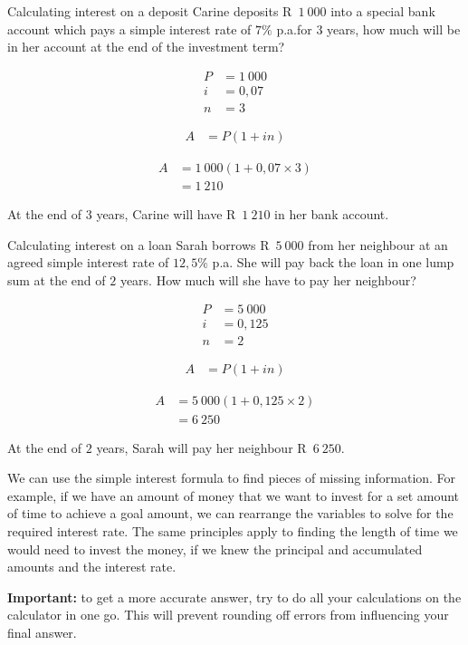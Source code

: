 \begin{wex}{Calculating interest on a deposit}
{Carine deposits R~$1~000$ into a special bank account which pays a
  simple interest rate of $7\%$ p.a.\@ for $3$ years, how much will be
  in her account at the end of the investment term?}
{
    \begin{align*}
	P &= 1~000\\
	i &= 0,07\\
	n &= 3
    \end{align*}
    
    \begin{align*}
	A &= P(1 + in)
    \end{align*}

    \begin{align*}
	A &= 1~000(1 + 0,07 \times 3)\\
	  &= 1~210
    \end{align*}

    At the end of $3$ years, Carine will have R~$1~210$ in her bank account.
    }
\end{wex}


\begin{wex}{Calculating interest on a loan}
{Sarah borrows R~$5~000$ from her neighbour at an agreed simple
  interest rate of $12,5\%$ p.a. She will pay back the loan in one
  lump sum at the end of $2$ years. How much will she have to pay her
  neighbour?}
{
    \begin{align*}
	P &= 5~000\\
	i &= 0,125\\
	n &= 2
    \end{align*}

    \begin{align*}
	A &= P(1 + in)
    \end{align*}

    \begin{align*}
	A &= 5~000(1 + 0,125 \times 2)\\
	  &= 6~250
    \end{align*}

    At the end of $2$ years, Sarah will pay her neighbour R~$6~250$.
    }
\end{wex}


We can use the simple interest formula to find pieces of missing information. For example, if we have an amount of money that we want to invest for a set amount of time to achieve a goal amount, we can rearrange the variables to solve for the required interest rate. The same principles apply to finding the length of time we would need to invest the money, if we knew the principal and accumulated amounts and the interest rate.
\par
\textbf{Important:} to get a more accurate answer, try to do all your calculations on the calculator in one go. This will prevent rounding off errors from influencing your final answer.

